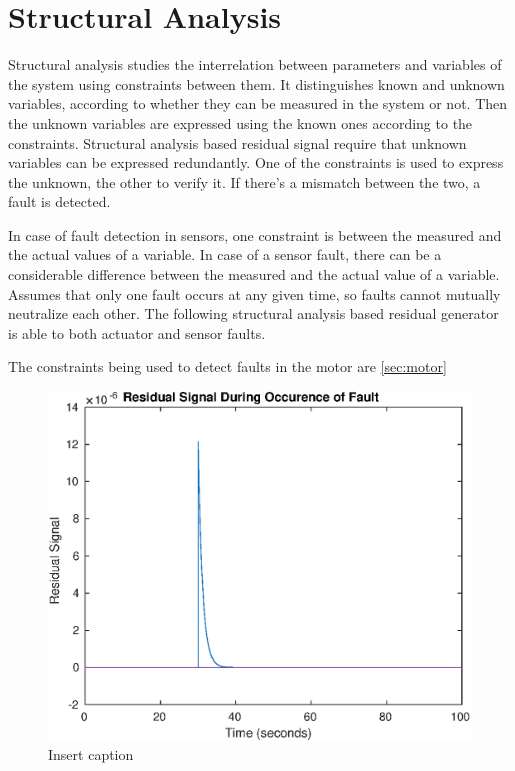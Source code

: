 \section{Structural Analysis}

\label{sec:structural}

Structural analysis studies the interrelation between parameters and variables of the system using constraints between them. It distinguishes known and unknown variables, according to whether they can be measured in the system or not. Then the unknown variables are expressed using the known ones according to the constraints. Structural analysis based residual signal require that unknown variables can be expressed redundantly. One of the constraints is used to express the unknown, the other to verify it. If there's a mismatch between the two, a fault is detected.

In case of fault detection in sensors, one constraint is between the measured and the actual values of a variable. In case of a sensor fault, there can be a considerable difference between the measured and the actual value of a variable. Assumes that only one fault occurs at any given time, so faults cannot mutually neutralize each other. The following structural analysis based residual generator is able to both actuator and sensor faults.

The constraints being used to detect faults in the motor are \ref{sec:motor} 

\begin{figure}
	\centering
	\includegraphics[width=120mm]{figures/residual}
	\caption{Insert caption}
	\label{fig:residual}
\end{figure} 

